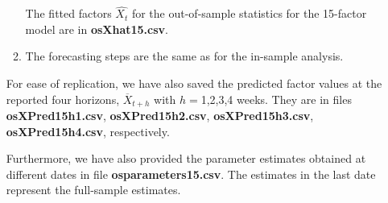 \documentclass[11pt]{article}
\begin{document}
\begin{enumerate}
\begin{enumerate}
The fitted factors $\widehat{X_t}$ for the out-of-sample statistics for the 15-factor model are in {\bf osXhat15.csv}.
 

\item The forecasting steps are the same as for the in-sample analysis.

\end{enumerate}

For ease of replication, we have also saved the predicted factor values at the reported four horizons, $\overline{X}_{t+h}$ with $h=$1,2,3,4 weeks. They are in files {\bf osXPred15h1.csv}, {\bf osXPred15h2.csv}, {\bf osXPred15h3.csv}, {\bf osXPred15h4.csv}, respectively.

Furthermore, we have also provided the parameter estimates obtained at different dates in file {\bf osparameters15.csv}. The estimates in the last date represent the full-sample estimates.


\end{enumerate}
\end{document}
